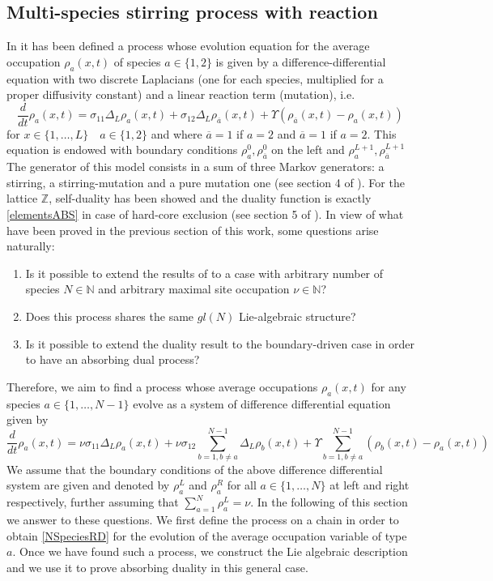 \documentclass[10pt]{article}
\numberwithin{equation}{section}
\numberwithin{equation}{subsection}
\begin{document}
\subsection{Multi-species stirring process with reaction} \label{Subsection-RD}
In \cite{casini2022uphill} it has been defined a process whose evolution equation for the average occupation $\rho_{a}(x,t)$ of species $a\in \{1,2\}$ is given by a difference-differential equation with two discrete Laplacians (one for each species, multiplied for a proper diffusivity constant) and a linear reaction term (mutation), i.e.
\begin{equation}\label{2SpeciesRD}
	\frac{d}{dt} \rho_{a}(x,t)=\sigma_{11}\Delta_{L}\rho_{a}(x,t)+\sigma_{12}\Delta_{L}\rho_{\overline{a}}(x,t)+\Upsilon\left(\rho_{\overline{a}}(x,t)-\rho_{a}(x,t)\right)
\end{equation} 
for $ x\in\{1,\ldots,L\}\quad a\in\{1,2\}$  and where $\overline{a}=1$ if $a=2$ and $\overline{a}=1$ if $a=2$.
This equation is endowed with boundary conditions $\rho_{a}^{0},\rho_{\overline{a}}^{0}$ on the left and $\rho_{a}^{L+1},\rho_{\overline{a}}^{L+1}$ \\The generator of this model consists in a sum of three Markov generators: a stirring, a stirring-mutation and a pure mutation one (see section 4 of \cite{casini2022uphill}). For the lattice $\mathbb{Z}$, self-duality has been showed and the duality function is exactly \eqref{elementsABS} in case of hard-core exclusion (see section 5 of \cite{casini2022uphill}). In view of what have been proved in the previous section of this work, some questions arise naturally:
\begin{enumerate}
		\item Is it possible to extend the results of \cite{casini2022uphill} to a case with arbitrary number of species $N\in \mathbb{N}$ and arbitrary maximal site occupation $\nu\in \mathbb{N}$?
			\item Does this process shares the same $gl(N)$ Lie-algebraic structure?
	\item Is it possible to extend the duality result to the boundary-driven case in order to have an absorbing dual process?
\end{enumerate}
Therefore, we aim to find a process whose average occupations $\rho_{a}(x,t)$ for any species $a\in\{1,\ldots,N-1\}$ evolve as a system of difference differential equation given by 
\begin{equation}\label{NSpeciesRD}
	\frac{d}{dt} \rho_{a}(x,t)=\nu\sigma_{11}\Delta_{L}\rho_{a}(x,t)+\nu\sigma_{12}\sum_{b=1,b\neq a}^{N-1}\Delta_{L}\rho_{b}(x,t)+\Upsilon\sum_{b=1,b\neq a}^{N-1}\left(\rho_{b}(x,t)-\rho_{a}(x,t)\right)
\end{equation} 
 We assume that the boundary conditions of the above difference differential system are given and denoted by $\rho_{a}^{L}$ and $\rho_{a}^{R}$ for all $a\in\{1,\ldots,N\}$ at left and right respectively, further assuming that $\sum_{a=1}^{N}\rho_{a}^{L}=\nu$.
In the following of this section we answer to these questions. We first define the process on a chain in order to obtain \eqref{NSpeciesRD} for the evolution of the average occupation variable of type $a$. Once we have found such a process, we construct the Lie algebraic description and we use it to prove absorbing duality in this general case. 
\end{document}
